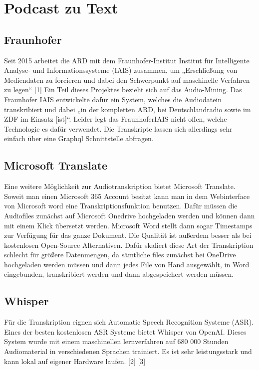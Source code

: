  
\section{Podcast zu Text}


\subsection{Fraunhofer}

Seit 2015 arbeitet die ARD mit dem Fraunhofer-Institut Institut für Intelligente Analyse- und Informationssysteme (IAIS) zusammen, um „Erschließung von Mediendaten zu forcieren und dabei den Schwerpunkt auf maschinelle Verfahren zu legen“ [1]
Ein Teil dieses Projektes bezieht sich auf das Audio-Mining. 
Das Fraunhofer IAIS entwickelte dafür ein System, welches die Audiodatein transkribiert und dabei „in der kompletten ARD, bei Deutschlandradio sowie im ZDF im Einsatz [ist]“. 
Leider legt das FraunhoferIAIS nicht offen, welche Technologie es dafür verwendet. 
Die Transkripte lassen sich allerdings sehr einfach über eine Graphql Schnittstelle abfragen. 

\subsection{Microsoft Translate}


Eine weitere Möglichkeit zur Audiotranskription bietet Microsoft Translate. 
Soweit man einen Microsoft 365 Account besitzt kann man in dem Webinterface von Microsoft word eine Transkriptionsfunktion benutzen. 
Dafür müssen die Audiofiles zunächst auf Microsoft Onedrive hochgeladen werden und können dann mit einem Klick übersetzt werden. 
Microsoft Word stellt dann sogar Timestamps  zur Verfügung für das ganze Dokument. 
Die Qualität ist außerdem besser als bei kostenlosen Open-Source Alternativen. 
Dafür skaliert diese Art der Transkription schlecht für größere Datenmengen, da sämtliche files zunächst bei OneDrive hochgeladen werden müssen und dann jedes File von Hand ausgewählt, in Word eingebunden, transkribiert werden und dann abgespeichert werden müssen. 

\subsection{Whisper}

Für die Transkription eignen sich Automatic Speech Recognition Systeme (ASR). 
Eines der besten kostenlosen ASR Systeme bietet Whisper von OpenAI. 
Dieses System wurde mit einem maschinellen lernverfahren auf 680 000 Stunden Audiomaterial in verschiedenen Sprachen trainiert. 
Es ist sehr leistungsstark und kann lokal auf eigener Hardware laufen. [2] [3]

